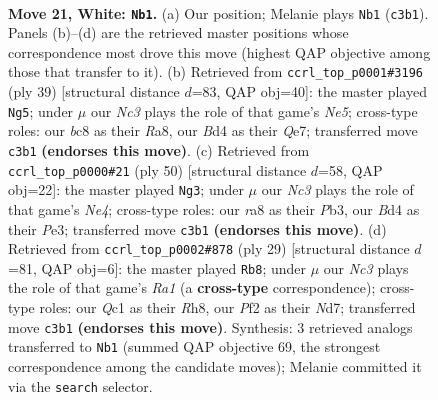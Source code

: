 \documentclass[11pt]{article}
\begin{document}
\clearpage

\begin{figure}[p]\centering
\begin{subfigure}{0.46\textwidth}\centering
\resizebox{\linewidth}{!}{%
\newchessgame
\chessboard[
  setfen={rnb1k1r1/8/3pq3/p4ppp/1p1B4/2N5/PPP2PPP/R1Q3KR w q - 0 21},
  showmover=false,
  pgfstyle=straightmove, color=movearrow, markmove={c3-b1}
]}
\caption{}
\end{subfigure}\hfill
\begin{subfigure}{0.46\textwidth}\centering
\resizebox{\linewidth}{!}{%
\newchessgame
\chessboard[
  setfen={r4rk1/p3qpp1/7p/2pp4/4n3/3BPP1P/PPQ2P2/2RR2K1 b - - 0 20},
  showmover=false,
  pgfstyle=straightmove, color=movearrow, markmove={e4-g5}
]}
\caption{}
\end{subfigure}
\\[4pt]
\begin{subfigure}{0.46\textwidth}\centering
\resizebox{\linewidth}{!}{%
\newchessgame
\chessboard[
  setfen={1r1r2k1/pp4p1/4q1np/4pp2/4N3/1P2PQ2/P4PPP/R1R3K1 w - - 0 26},
  showmover=false,
  pgfstyle=straightmove, color=movearrow, markmove={e4-g3}
]}
\caption{}
\end{subfigure}\hfill
\begin{subfigure}{0.46\textwidth}\centering
\resizebox{\linewidth}{!}{%
\newchessgame
\chessboard[
  setfen={r1b1k2r/1p1nqpp1/p3p2p/8/2NP4/1Q6/PP2BPPP/R3K2R b KQkq - 3 15},
  showmover=false,
  pgfstyle=straightmove, color=movearrow, markmove={a8-b8}
]}
\caption{}
\end{subfigure}
\caption{\textbf{Move 21, White: \texttt{Nb1}.} (a) Our position; Melanie plays \texttt{Nb1} (\texttt{c3b1}). Panels (b)--(d) are the retrieved master positions whose correspondence most drove this move (highest QAP objective among those that transfer to it). (b) Retrieved from \texttt{ccrl\_top\_p0001\#3196} (ply 39) [structural distance $d$=83, QAP obj=40]: the master played \texttt{Ng5}; under $\mu$ our \emph{Nc3} plays the role of that game's \emph{Ne5}; cross-type roles: our \emph{b}c8 as their \emph{R}a8, our \emph{B}d4 as their \emph{Q}e7; transferred move \texttt{c3b1} \textbf{(endorses this move)}. (c) Retrieved from \texttt{ccrl\_top\_p0000\#21} (ply 50) [structural distance $d$=58, QAP obj=22]: the master played \texttt{Ng3}; under $\mu$ our \emph{Nc3} plays the role of that game's \emph{Ne4}; cross-type roles: our \emph{r}a8 as their \emph{P}b3, our \emph{B}d4 as their \emph{P}e3; transferred move \texttt{c3b1} \textbf{(endorses this move)}. (d) Retrieved from \texttt{ccrl\_top\_p0002\#878} (ply 29) [structural distance $d$=81, QAP obj=6]: the master played \texttt{Rb8}; under $\mu$ our \emph{Nc3} plays the role of that game's \emph{Ra1} (a \textbf{cross-type} correspondence); cross-type roles: our \emph{Q}c1 as their \emph{R}h8, our \emph{P}f2 as their \emph{N}d7; transferred move \texttt{c3b1} \textbf{(endorses this move)}. Synthesis: 3 retrieved analogs transferred to \texttt{Nb1} (summed QAP objective 69, the strongest correspondence among the candidate moves); Melanie committed it via the \texttt{search} selector.}
\label{fig:thought-m40}
\end{figure}
\end{document}
